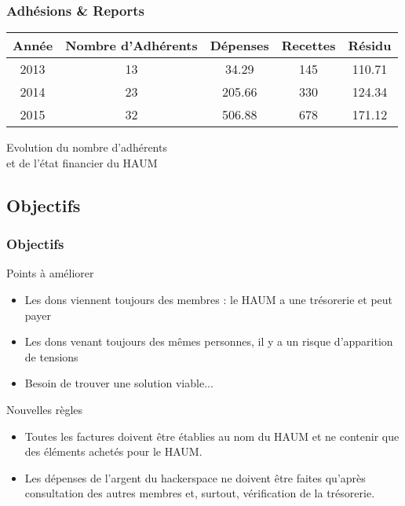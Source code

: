 \documentclass[10pt, compress]{beamer}
\begin{document}
\begin{frame}
	\frametitle{Adhésions \& Reports}
	\centering
	\begin{tabular}{ccccc}\toprule
		Année & Nombre d'Adhérents & Dépenses & Recettes & Résidu\\\midrule
		2013 & 13 & 34.29 & 145 & 110.71\\
		2014 & 23 & 205.66 & 330 & 124.34\\
		2015 & 32 & 506.88 & 678 & 171.12\\\bottomrule
	\end{tabular}

	\vspace{1cm}
	Evolution du nombre d'adhérents\\et de l'état financier du HAUM
\end{frame}

\subsection{Objectifs}

\begin{frame}
	\frametitle{Objectifs}


	\begin{block}{Points à améliorer}

		\begin{itemize}
			\item Les dons viennent toujours des membres : \alert{le HAUM} a une trésorerie et \alert{peut payer}
			\item Les dons venant toujours des mêmes personnes, il y a un \alert{risque d'apparition de tensions}
			\item Besoin de trouver une \alert{solution viable}...
		\end{itemize}

	\end{block}

	\pause

	\begin{block}{Nouvelles règles}

		\begin{itemize}
			\item Toutes les factures doivent être établies \alert{au nom du HAUM} et ne contenir que des éléments
				\alert{achetés pour le HAUM}. 
			\item Les dépenses de l'argent du hackerspace ne doivent être faites qu'après \alert{consultation des autres
				membres} et, surtout, \alert{vérification de la trésorerie}.
		\end{itemize}

	\end{block}
\end{frame}
\end{document}
